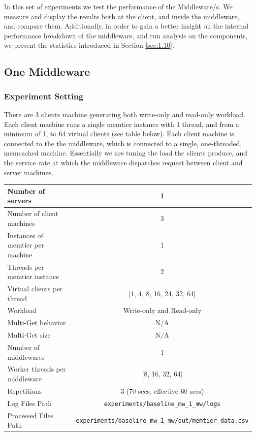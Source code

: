 \documentclass[11pt,a4paper]{article}
\begin{document}
In this set of experiments we test the performance of the Middleware/s. 
We measure and display the results both at the client, and inside the middleware, and compare them.
Additionally, in order to gain a better insight on the internal performance breakdown of the middleware, and run analysis on the components, we present the statistics introduced in Section \ref{sec:1.10}.

\subsection{One Middleware}

\subsubsection{Experiment Setting}

There are 3 clients machine generating both write-only and read-only workload. Each client machine runs a single memtier instance with 1 thread, and from a minimum of 1, to 64 virtual clients (see table below).
Each client machine is connected to the the middleware, which is connected to a single, one-threaded, memcached machine.
Essentially we are tuning the load the clients produce, and the service rate at which the middleware dispatches request between client and server machines. 

\begin{center}
	\scriptsize{
		\begin{tabular}{|l|c|}
			\hline Number of servers                & 1                        \\ 
			\hline Number of client machines        & 3                        \\ 
			\hline Instances of memtier per machine & 1                        \\ 
			\hline Threads per memtier instance     & 2                        \\
            \hline Virtual clients per thread       & [1, 4, 8, 16, 24, 32, 64]\\ 
			\hline Workload                         & Write-only and Read-only \\
			\hline Multi-Get behavior               & N/A                      \\
			\hline Multi-Get size                   & N/A                      \\
			\hline Number of middlewares            & 1                        \\
			\hline Worker threads per middleware    & [8, 16, 32, 64]                  \\
            \hline Repetitions                      & 3 (70 secs, effective 60 secs) \\ 
            \hline Log Files Path                   & \texttt{experiments/baseline\_mw\_1\_mw/logs} \\
            \hline Processed Files Path             & \texttt{experiments/baseline\_mw\_1\_mw/out/memtier\_data.csv}\\
            \hline
		\end{tabular}
	} 
\end{center}
\end{document}
